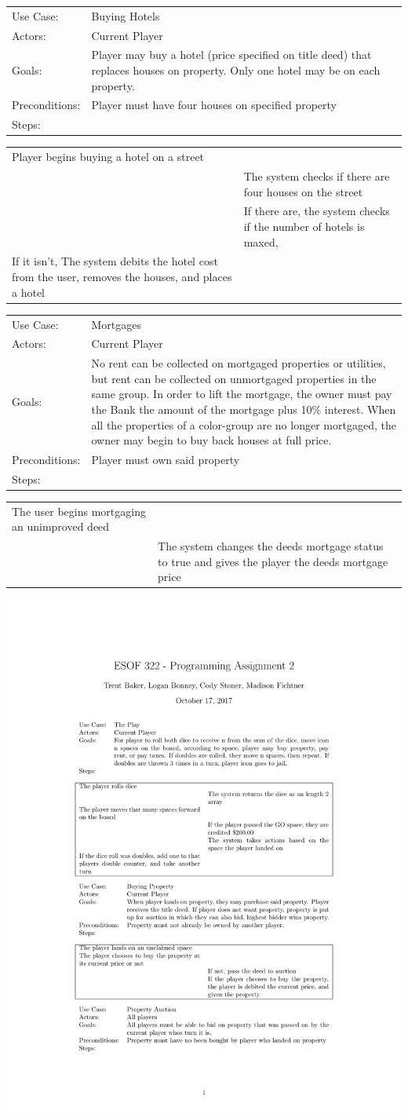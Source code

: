 \documentclass[10pt,letterpaper]{article}
\newcommand{\usecasetwocol}[1]{
\begin{center}
	\begin{tabularx}{0.8\textwidth}{| X X |}
		\hline
		#1 \\
		\hline
	\end{tabularx}
\end{center}
}
\newcommand{\usecasedescription}[1]{
\begin{center}
	\begin{tabularx}{0.8\textwidth}{l X}
		#1
	\end{tabularx}
\end{center}
}
\newcommand{\usecase}[2]{
\usecasedescription{#1}
\usecasetwocol{#2}
}
\begin{document}
\usecase{Use Case: & Buying Hotels \\
	Actors: & Current Player \\
	Goals: & Player may buy a hotel (price specified on title deed) that replaces houses on property. Only one hotel may be on each property. \\
	Preconditions: & Player must have four houses on specified property  \\
	Steps: &  }{Player begins buying a hotel on a street &\\
	&The system checks if there are four houses on the street \\
	&If there are, the system checks if the number of hotels is maxed,  \\
	If it isn’t, The system debits the hotel cost from the user, removes the houses, and places a hotel&}

\usecase{Use Case: & Mortgages \\
	Actors: & Current Player \\
	Goals: &  No rent can be collected on mortgaged properties or utilities, but rent can be collected on unmortgaged properties in the same group. In order to lift the mortgage, the owner must pay the Bank the amount of the mortgage plus 10\% interest. When all the properties of a color-group are no longer mortgaged, the owner may begin to buy back houses at full price.  \\
	Preconditions: & Player must own said property \\
	Steps: & }{The user begins mortgaging an unimproved deed &\\
	&The system changes the deeds mortgage status to true and gives the player the deeds mortgage price}

\includegraphics[width=\textwidth]{ESOF322_PA2}
\end{document}
